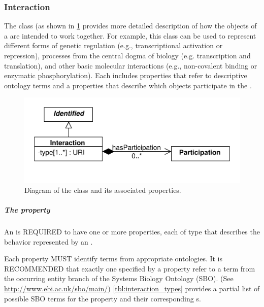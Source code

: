 
\subsubsection{Interaction}
\label{sec:Interaction}

The  class (as shown in \ref{uml:interaction} provides more detailed description of how the  objects of a  are intended to work together.  
For example, this class can be used to represent different forms of genetic regulation (e.g., transcriptional activation or repression), processes from the central dogma of biology (e.g. transcription and translation), and other basic molecular interactions (e.g., non-covalent binding or enzymatic phosphorylation).
Each  includes  properties that refer to descriptive ontology terms and a  properties that describe which  objects participate in the .

\begin{figure}[ht]
\begin{center}
\includegraphics[scale=0.6]{uml/interaction}
\caption[]{Diagram of the  class and its associated properties.}
\label{uml:interaction}
\end{center}
\end{figure}

\subparagraph{The  property}\label{sec:type:I}

An  is REQUIRED to have one or more  properties, each of type  that describes the behavior represented by an .

Each  property MUST identify terms from appropriate ontologies. It is RECOMMENDED that exactly one  specified by a  property refer to a term from the occurring entity branch of the Systems Biology Ontology (SBO). (See \url{http://www.ebi.ac.uk/sbo/main/}) \ref{tbl:interaction_types} provides a partial list of possible SBO terms for the  property and their corresponding s.

